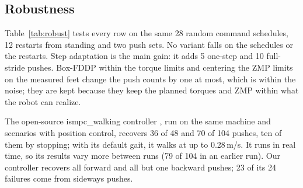 \documentclass[conference]{IEEEtran}
\begin{document}
\begin{table}[t]
\caption{Failures and push recovery of the base controller}
\label{tab:robust}
\centering
\setlength{\tabcolsep}{3pt}
\end{table}

\subsection{Robustness}
Table~\ref{tab:robust} tests every row on the same 28 random command schedules, 12 restarts from standing and two push sets.
No variant falls on the schedules or the restarts.
Step adaptation is the main gain: it adds 5 one-step and 10 full-stride pushes.
Box-FDDP within the torque limits and centering the ZMP limits on the measured feet change the push counts by one at most, which is within the noise; they are kept because they keep the planned torques and ZMP within what the robot can realize.

The open-source ismpc\_walking controller \cite{mc_ismpcwalking}, run on the same machine and scenarios with position control, recovers 36 of 48 and 70 of 104 pushes, ten of them by stopping; with its default gait, it walks at up to 0.28\,m/s.
It runs in real time, so its results vary more between runs (79 of 104 in an earlier run).
Our controller recovers all forward and all but one backward pushes; 23 of its 24 failures come from sideways pushes.
\end{document}
